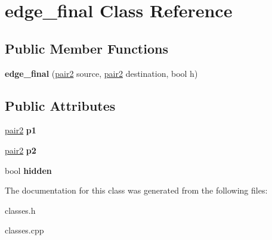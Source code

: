 \hypertarget{classedge__final}{}\section{edge\+\_\+final Class Reference}
\label{classedge__final}
\subsection*{Public Member Functions}
\begin{DoxyCompactItemize}
\item 
\mbox{\label{classedge__final_a4225d843dc9446daea26c9d132c4a52e}} 
{\bfseries edge\+\_\+final} (\mbox{\hyperlink{classpair2}{pair2}} source, \mbox{\hyperlink{classpair2}{pair2}} destination, bool h)
\end{DoxyCompactItemize}
\subsection*{Public Attributes}
\begin{DoxyCompactItemize}
\item 
\mbox{\label{classedge__final_ae6182a6d67ff0c962963349e23a2f73c}} 
\mbox{\hyperlink{classpair2}{pair2}} {\bfseries p1}
\item 
\mbox{\label{classedge__final_a44f33f94dd704714fc5ddf9cd47dc5b4}} 
\mbox{\hyperlink{classpair2}{pair2}} {\bfseries p2}
\item 
\mbox{\label{classedge__final_af6e0c638afa6d69c69ec7f9c3df041cf}} 
bool {\bfseries hidden}
\end{DoxyCompactItemize}


The documentation for this class was generated from the following files\+:\begin{DoxyCompactItemize}
\item 
classes.\+h\item 
classes.\+cpp\end{DoxyCompactItemize}

